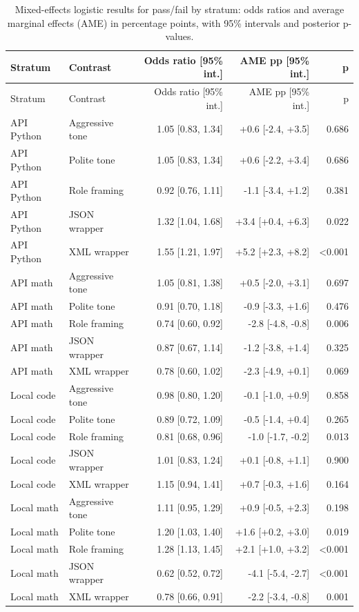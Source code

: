\documentclass{llncs}
\begin{document}
\begin{longtable}[]{@{}llrrr@{}}
\caption{Mixed-effects logistic results for pass/fail by stratum: odds ratios and average marginal effects (AME) in percentage points, with 95\% intervals and posterior p-values.}\label{tab:mixed-effects-pass}\tabularnewline
\toprule\noalign{}
Stratum & Contrast & Odds ratio [95\% int.] & AME pp [95\% int.] & p \\
\midrule\noalign{}
\endfirsthead
\toprule\noalign{}
Stratum & Contrast & Odds ratio [95\% int.] & AME pp [95\% int.] & p \\
\midrule\noalign{}
\endhead
\bottomrule\noalign{}
\endlastfoot
API Python & Aggressive tone & 1.05 [0.83, 1.34] & +0.6 [-2.4, +3.5] & 0.686 \\
API Python & Polite tone & 1.05 [0.83, 1.34] & +0.6 [-2.2, +3.4] & 0.686 \\
API Python & Role framing & 0.92 [0.76, 1.11] & -1.1 [-3.4, +1.2] & 0.381 \\
API Python & JSON wrapper & 1.32 [1.04, 1.68] & +3.4 [+0.4, +6.3] & 0.022 \\
API Python & XML wrapper & 1.55 [1.21, 1.97] & +5.2 [+2.3, +8.2] & \textless{}0.001 \\
API math & Aggressive tone & 1.05 [0.81, 1.38] & +0.5 [-2.0, +3.1] & 0.697 \\
API math & Polite tone & 0.91 [0.70, 1.18] & -0.9 [-3.3, +1.6] & 0.476 \\
API math & Role framing & 0.74 [0.60, 0.92] & -2.8 [-4.8, -0.8] & 0.006 \\
API math & JSON wrapper & 0.87 [0.67, 1.14] & -1.2 [-3.8, +1.4] & 0.325 \\
API math & XML wrapper & 0.78 [0.60, 1.02] & -2.3 [-4.9, +0.1] & 0.069 \\
Local code & Aggressive tone & 0.98 [0.80, 1.20] & -0.1 [-1.0, +0.9] & 0.858 \\
Local code & Polite tone & 0.89 [0.72, 1.09] & -0.5 [-1.4, +0.4] & 0.265 \\
Local code & Role framing & 0.81 [0.68, 0.96] & -1.0 [-1.7, -0.2] & 0.013 \\
Local code & JSON wrapper & 1.01 [0.83, 1.24] & +0.1 [-0.8, +1.1] & 0.900 \\
Local code & XML wrapper & 1.15 [0.94, 1.41] & +0.7 [-0.3, +1.6] & 0.164 \\
Local math & Aggressive tone & 1.11 [0.95, 1.29] & +0.9 [-0.5, +2.3] & 0.198 \\
Local math & Polite tone & 1.20 [1.03, 1.40] & +1.6 [+0.2, +3.0] & 0.019 \\
Local math & Role framing & 1.28 [1.13, 1.45] & +2.1 [+1.0, +3.2] & \textless{}0.001 \\
Local math & JSON wrapper & 0.62 [0.52, 0.72] & -4.1 [-5.4, -2.7] & \textless{}0.001 \\
Local math & XML wrapper & 0.78 [0.66, 0.91] & -2.2 [-3.4, -0.8] & 0.001 \\
\end{longtable}
\end{document}

